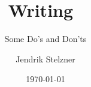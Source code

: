 \documentclass[
  a4paper,
  10pt,
  oneside,
  chapterprefix = true,
  listof=totoc,
  bibliography=totocnumbered
]
{scrbook}
\title{Writing~\hologo{LaTeX}}
\subtitle{Some Do’s and Don’ts}
\author{Jendrik Stelzner}
\date{\today}
\begin{document}
\frontmatter
\maketitle

\tableofcontents
\listoftables
\listoffigures


\mainmatter





% 


\backmatter
\printbibliography
\lstlistoflistings
\end{document}
